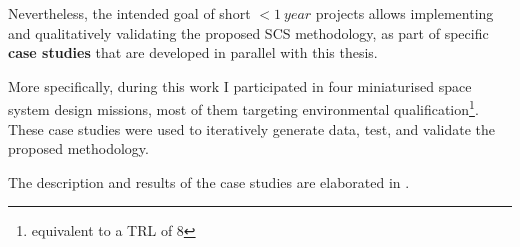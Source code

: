 \documentclass[a4paper,nobib,justified,final]{tufte-book}
\begin{document}
\begin{enumerate}
	Nevertheless, the intended goal of short \( < \qty{1}{year}\) projects allows implementing and qualitatively validating the proposed \acs{SCS} methodology, as part of specific \textbf{case studies} that are developed in parallel with this thesis.
	
	More specifically, during this work I participated in four miniaturised space system design missions, most of them targeting environmental qualification\footnote{equivalent to a \acs{TRL} of 8}.
	These case studies were used to iteratively generate data, test, and validate the proposed methodology.
	
	
	The description and results of the case studies are elaborated in .	
	
\end{enumerate}
\end{document}
